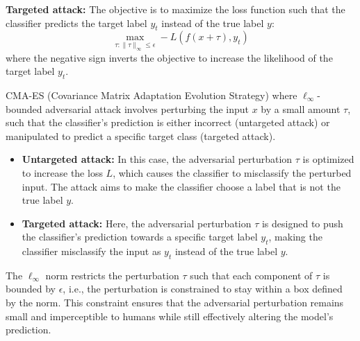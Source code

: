 \textbf{Targeted attack:} The objective is to maximize the loss function such that the classifier predicts the target label \( y_t \) instead of the true label \( y \):
\[
\max_{\tau: \|\tau\|_\infty \leq \epsilon} -L(f(x + \tau), y_t)
\]
where the negative sign inverts the objective to increase the likelihood of the target label \( y_t \).

CMA-ES (Covariance Matrix Adaptation Evolution Strategy) where \( \ell_\infty \)-bounded adversarial attack involves perturbing the input \( x \) by a small amount \( \tau \), such that the classifier's prediction is either incorrect (untargeted attack) or manipulated to predict a specific target class (targeted attack).

\begin{itemize}
    \item \textbf{Untargeted attack:} In this case, the adversarial perturbation \( \tau \) is optimized to increase the loss \( L \), which causes the classifier to misclassify the perturbed input. The attack aims to make the classifier choose a label that is not the true label \( y \).
    \item \textbf{Targeted attack:} Here, the adversarial perturbation \( \tau \) is designed to push the classifier's prediction towards a specific target label \( y_t \), making the classifier misclassify the input as \( y_t \) instead of the true label \( y \).
\end{itemize}

The \( \ell_\infty \) norm restricts the perturbation \( \tau \) such that each component of \( \tau \) is bounded by \( \epsilon \), i.e., the perturbation is constrained to stay within a box defined by the norm. This constraint ensures that the adversarial perturbation remains small and imperceptible to humans while still effectively altering the model's prediction.